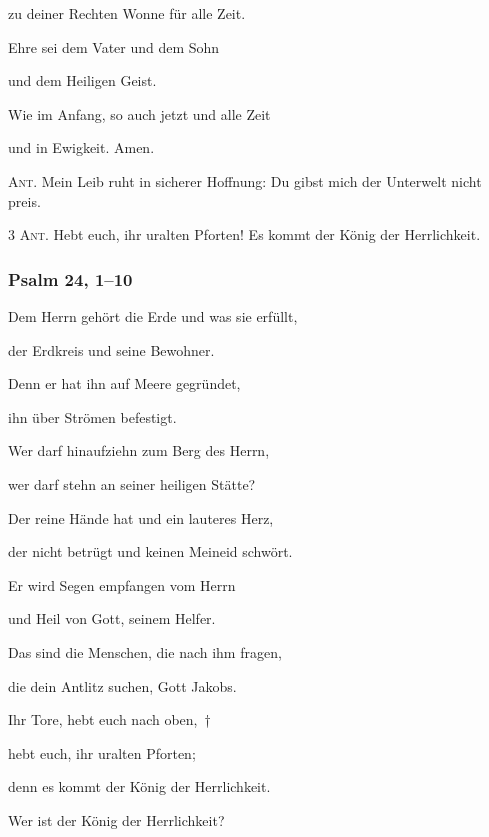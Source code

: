 zu deiner Rechten Wonne für alle Zeit.

\noindent Ehre sei dem Vater und dem Sohn~\GreStar{}~\nopagebreak

und dem Heiligen Geist.

\noindent Wie im Anfang, so auch jetzt und alle Zeit~\GreStar{}~\nopagebreak

und in Ewigkeit. Amen.

\vspace{10pt}

\noindent \textsc{Ant.} Mein Leib ruht in sicherer Hoffnung: Du gibst mich der Unterwelt nicht preis.

\vspace{10pt}

\noindent \textsc{3 Ant.} Hebt euch, ihr uralten Pforten! Es kommt der König der Herrlichkeit.

\subsubsection{Psalm 24, 1--10}

\noindent Dem Herrn gehört die Erde und was sie erfüllt,~\GreStar{}~\nopagebreak

der Erdkreis und seine Bewohner.

\noindent Denn er hat ihn auf Meere gegründet,~\GreStar{}~\nopagebreak

ihn über Strömen befestigt.

\noindent Wer darf hinaufziehn zum Berg des Herrn,~\GreStar{}~\nopagebreak

wer darf stehn an seiner heiligen Stätte?

\noindent Der reine Hände hat und ein lauteres Herz,~\GreStar{}~\nopagebreak

der nicht betrügt und keinen Meineid schwört.

\noindent Er wird Segen empfangen vom Herrn~\GreStar{}~\nopagebreak

und Heil von Gott, seinem Helfer.

\noindent Das sind die Menschen, die nach ihm fragen,~\GreStar{}~\nopagebreak

die dein Antlitz suchen, Gott Jakobs.

\noindent Ihr Tore, hebt euch nach oben,~†~\nopagebreak

hebt euch, ihr uralten Pforten;~\GreStar{}~\nopagebreak

denn es kommt der König der Herrlichkeit.

\noindent Wer ist der König der Herrlichkeit?~\GreStar{}~\nopagebreak

